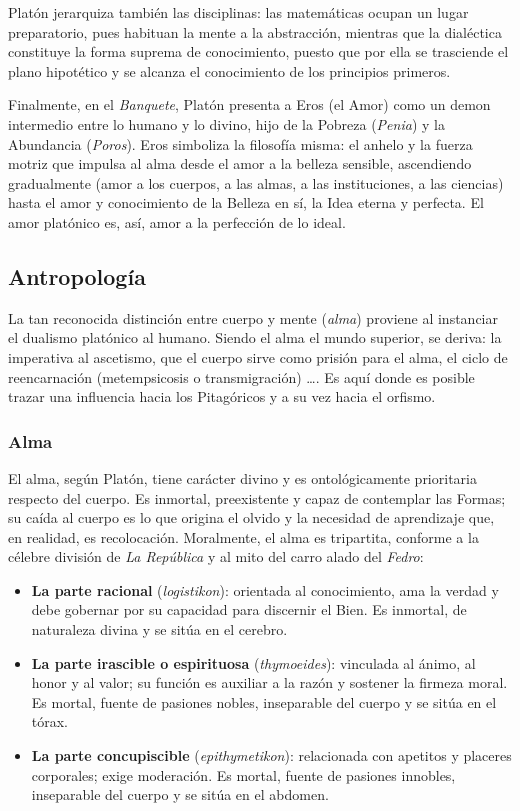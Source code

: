 \documentclass[10pt]{article}
\begin{document}
Platón jerarquiza también las disciplinas: las matemáticas ocupan un lugar preparatorio, pues habituan la mente a la abstracción, mientras que la dialéctica constituye
la forma suprema de conocimiento, puesto que por ella se trasciende el plano hipotético y se alcanza el conocimiento de los principios primeros.

Finalmente, en el \textit{Banquete}, Platón presenta a Eros (el Amor) como un demon intermedio entre lo humano y lo divino, hijo de la Pobreza (\textit{Penia}) y la Abundancia (\textit{Poros}).
Eros simboliza la filosofía misma: el anhelo y la fuerza motriz que impulsa al alma desde el amor a la belleza sensible, ascendiendo gradualmente (amor a los cuerpos, a las almas,
a las instituciones, a las ciencias) hasta el amor y conocimiento de la Belleza en sí, la Idea eterna y perfecta. El amor platónico es, así, amor a la perfección de lo ideal.

\subsection{Antropología}

La tan reconocida distinción entre cuerpo y mente (\textit{alma}) proviene al instanciar el dualismo platónico al humano. Siendo el alma
el mundo superior, se deriva: la imperativa al ascetismo, que el cuerpo sirve como prisión para el alma, el ciclo de reencarnación
(metempsicosis o transmigración) \dots . Es aquí donde es posible trazar una influencia hacia los Pitagóricos y a su vez hacia el orfismo.

\subsubsection{Alma}

El alma, según Platón, tiene carácter divino y es ontológicamente prioritaria respecto del cuerpo. Es inmortal, preexistente y capaz de contemplar las Formas;
su caída al cuerpo es lo que origina el olvido y la necesidad de aprendizaje que, en realidad, es recolocación. Moralmente, el alma es tripartita, conforme a la
célebre división de \emph{La República} y al mito del carro alado del \textit{Fedro}:

\begin{itemize}
  \item \textbf{La parte racional} (\textit{logistikon}): orientada al conocimiento, ama la verdad y debe gobernar por su capacidad para discernir el Bien. Es inmortal, de naturaleza
    divina y se sitúa en el cerebro.
  \item \textbf{La parte irascible o espirituosa} (\textit{thymoeides}): vinculada al ánimo, al honor y al valor; su función es auxiliar a la razón y sostener la firmeza moral. 
    Es mortal, fuente de pasiones nobles, inseparable del cuerpo y se sitúa en el tórax.
  \item \textbf{La parte concupiscible} (\textit{epithymetikon}): relacionada con apetitos y placeres corporales; exige moderación. Es mortal, fuente de pasiones innobles, inseparable
    del cuerpo y se sitúa en el abdomen.
\end{itemize}
\end{document}
